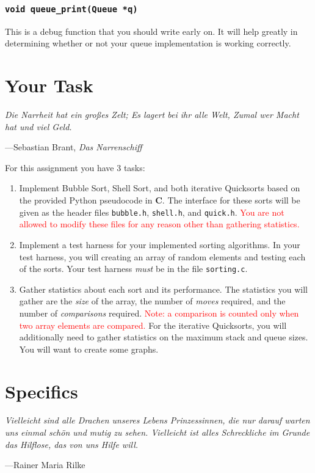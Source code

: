 \documentclass[11pt]{article}
\begin{document}
\subsubsection{\texttt{void queue\_print(Queue *q)}}

This is a debug function that you should write early on. It will help
greatly in determining whether or not your queue implementation is
working correctly.


\section{Your Task}

\epigraph{\emph{Die Narrheit hat ein gro\ss{}es Zelt; Es lagert bei ihr alle
Welt, Zumal wer Macht hat und viel Geld.}}{---Sebastian Brant, \emph{Das
Narrenschiff}}

\noindent For this assignment you have 3 tasks:

\begin{enumerate}
  \item Implement Bubble Sort, Shell Sort, and both iterative Quicksorts
    based on the provided Python pseudocode in \textbf{C}. The interface
    for these sorts will be given as the header files \texttt{bubble.h},
    \texttt{shell.h}, and \texttt{quick.h}. \textcolor{red}{You are not
    allowed to modify these files for any reason other than gathering
  statistics.}
  \item Implement a test harness for your implemented sorting
    algorithms. In your test harness, you will creating an array of
    random elements and testing each of the sorts. Your test harness
    \emph{must} be in the file \texttt{sorting.c}.
  \item Gather statistics about each sort and its performance. The
    statistics you will gather are the \emph{size} of the array, the
    number of \emph{moves} required, and the number of
    \emph{comparisons} required. \textcolor{red}{Note: a comparison is
    counted only when two array elements are compared.} For the
    iterative Quicksorts, you will additionally need to gather
    statistics on the maximum stack and queue sizes. You will want to
    create some graphs.
\end{enumerate}


\section{Specifics}

\epigraph{\emph{Vielleicht sind alle Drachen unseres Lebens
  Prinzessinnen, die nur darauf warten uns einmal sch\"on und mutig zu
sehen. Vielleicht ist alles Schreckliche im Grunde das Hilflose, das von
uns Hilfe will.}}{---Rainer Maria Rilke}
\end{document}
